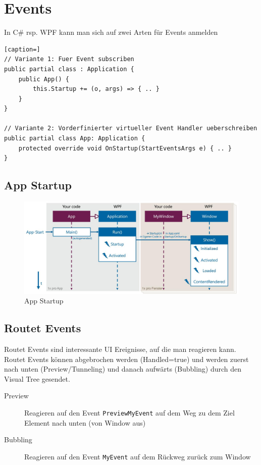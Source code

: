 \section{Events}
In C\# rsp. WPF kann man sich auf zwei Arten für Events anmelden
\begin{lstlisting}[caption=]
// Variante 1: Fuer Event subscriben
public partial class : Application {
	public App() {
		this.Startup += (o, args) => { .. }
	}
}

// Variante 2: Vorderfinierter virtueller Event Handler ueberschreiben
public partial class App: Application {
	protected override void OnStartup(StartEventsArgs e) { .. }
}
\end{lstlisting}

\subsection{App Startup}

\begin{figure}[h]
\centering
\includegraphics[width=0.7\linewidth]{images/app_startup}
\caption{App Startup}
\label{fig:appstartup}
\end{figure}

\subsection{Routet Events}
Routet Events sind interessante UI Ereignisse, auf die man reagieren kann. Routet Events können abgebrochen werden (Handled=true) und werden zuerst nach unten (Preview/Tunneling) und danach aufwärts (Bubbling) durch den Visual Tree gesendet.

\begin{description}
	\item[Preview] Reagieren auf den Event \lstinline|PreviewMyEvent| auf dem Weg zu dem Ziel Element nach unten (von Window aus)
	\item[Bubbling] Reagieren auf den Event \lstinline|MyEvent| auf dem Rückweg zurück zum Window
\end{description}

